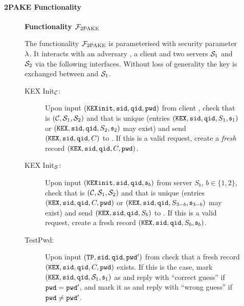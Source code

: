\paragraph{2PAKE Functionality}

\begin{figure}[tbp]
\begin{mdframed}[innertopmargin=10pt]
\begin{center}
{\bf Functionality $\mathcal{F}_{\mathrm{2PAKE}}$}
\end{center}
The functionality $\mathcal{F}_{\mathrm{2PAKE}}$ is parameterised with security parameter $\lambda$.
It interacts with an adversary \SIM, a client \Client and two servers $\mathcal{S}_1$ and $\mathcal{S}_2$ via the following interfaces.
Without loss of generality the key is exchanged between \Client and $\mathcal{S}_1$.

\begin{description}

  \item[KEX Init$_\mathcal{C}$:] Upon input $(\mathtt{KEXinit}, \mathtt{sid}, \mathtt{qid}, \mathtt{pwd})$ from client \Client, check that \sid is $(\mathcal{C}, \mathcal{S}_1, \mathcal{S}_2)$ and that \qid is unique (entries $(\mathtt{KEX}, \mathtt{sid}, \mathtt{qid}, S_{1}, \mathfrak{s}_{1})$ or $(\mathtt{KEX}, \mathtt{sid}, \mathtt{qid}, S_{2}, \mathfrak{s}_{2})$ may exist) and send $(\mathtt{KEX}, \mathtt{sid}, \mathtt{qid}, C)$ to \SIM.
      If this is a valid request, create a \emph{fresh} record $(\mathtt{KEX}, \mathtt{sid}, \mathtt{qid}, C, \mathtt{pwd})$.
  
  \item[KEX Init$_\mathcal{S}$:] Upon input $(\mathtt{KEXinit}, \mathtt{sid}, \mathtt{qid}, \mathfrak{s}_b)$ from server $S_b$, $b\in\{1,2\}$, check that \sid is $(\mathcal{C}, \mathcal{S}_1, \mathcal{S}_2)$ and that \qid is unique (entries $(\mathtt{KEX}, \mathtt{sid}, \mathtt{qid}, C, \mathtt{pwd})$ or $(\mathtt{KEX}, \mathtt{sid}, \mathtt{qid}, S_{3-b}, \mathfrak{s}_{3-b})$ may exist) and send $(\mathtt{KEX}, \mathtt{sid}, \mathtt{qid}, S_b)$ to \SIM.
      If this is a valid request, create a fresh record $(\mathtt{KEX}, \mathtt{sid}, \mathtt{qid}, S_b, \mathfrak{s}_b)$.
    
  \item[TestPwd:] Upon input $(\mathtt{TP}, \mathtt{sid}, \mathtt{qid}, \mathtt{pwd}')$ from \SIM check that a fresh record $(\mathtt{KEX}, \mathtt{sid}, \mathtt{qid}, C, \mathtt{pwd})$ exists. 
      If this is the case, mark $(\mathtt{KEX}, \mathtt{sid}, \mathtt{qid}, \mathcal{S}_1, \mathfrak{s}_1)$ as \compromised and reply with ``correct guess'' if $\mathtt{pwd}=\mathtt{pwd}'$, and mark it as \interrupted and reply with ``wrong guess'' if $\mathtt{pwd}\not=\mathtt{pwd}'$.
    
      

\end{description}
\end{mdframed}
\end{figure}
